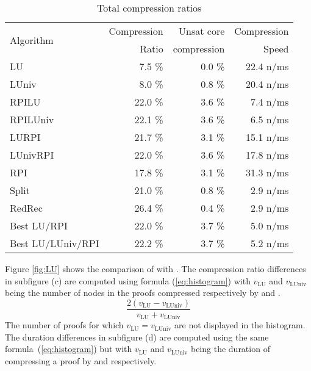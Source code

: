 \documentclass{llncs}
\begin{document}
\begin{table}[tb]
  \caption{Total compression ratios}
  \label{tab:average}
  \centering
  \begin{tabular}{lrrr}
    \toprule
    \multirow{2}{*}{Algorithm} & Compression & Unsat core  & Compression \\
                               &       Ratio & compression &       Speed \\
    \midrule
    LU                &  7.5 \% &  0.0 \% & 22.4 n/ms \\
    LUniv             &  8.0 \% &  0.8 \% & 20.4 n/ms \\
    RPILU             & 22.0 \% &  3.6 \% &  7.4 n/ms \\
    RPILUniv          & 22.1 \% &  3.6 \% &  6.5 n/ms \\
    LURPI             & 21.7 \% &  3.1 \% & 15.1 n/ms \\
    LUnivRPI          & 22.0 \% &  3.6 \% & 17.8 n/ms \\
    RPI               & 17.8 \% &  3.1 \% & 31.3 n/ms \\
    Split             & 21.0 \% &  0.8 \% &  2.9 n/ms \\
    RedRec           & 26.4 \% &  0.4 \% &  2.9 n/ms \\
    Best LU/RPI       & 22.0 \% &  3.7 \% &  5.0 n/ms \\
    Best LU/LUniv/RPI & 22.2 \% &  3.7 \% &  5.2 n/ms \\
    \bottomrule
  \end{tabular}
\end{table}

\newcommand{\va}[1]{\ensuremath{v_{\text{#1}}}}

Figure \ref{fig:LU} shows the comparison of {\LowerUnits} with {\LowerUnivalents}. The compression
ratio differences in subfigure (c) are computed using formula (\ref{eq:histogram}) with \va{LU}
and \va{LUniv} being the number of nodes in the proofs compressed respectively by {\LowerUnits} and
{\LowerUnivalents}.
\begin{equation} \label{eq:histogram}
  \frac { 2(\va{LU} - \va{LUniv}) }{ \va{LU} + \va{LUniv} }
\end{equation}
The number of proofs for which $\va{LU} = \va{LUniv}$ are not displayed in the histogram.
The duration differences in subfigure (d) are computed using the same formula~(\ref{eq:histogram}) but
with \va{LU} and \va{LUniv} being the duration of compressing a proof by {\LowerUnits} and
{\LowerUnits} respectively.
\end{document}

